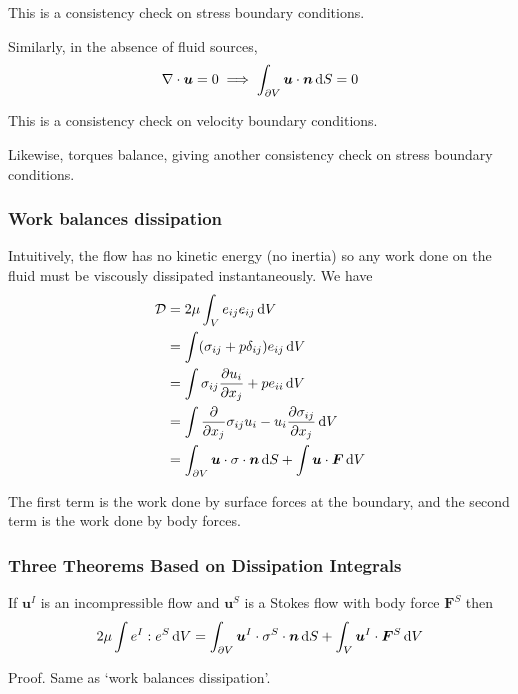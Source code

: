 \documentclass{jknotes}
\begin{document}
This is a consistency check on stress boundary conditions. 

Similarly, in the absence of fluid sources,
\begin{equation}
	\nabla \cdot \bm{u} = 0 \implies \int_{\partial V} \bm{u} \cdot \bm{n} \,
	\diffd S = 0
\end{equation}

This is a consistency check on velocity boundary conditions.

Likewise, torques balance, giving another consistency check on stress boundary
conditions.

\subsubsection{Work balances dissipation}
Intuitively, the flow has no kinetic energy (no inertia)  so any work done on
the fluid must be viscously dissipated instantaneously. We have
\begin{equation}
	\begin{aligned}
		\mathcal{D} &= 2\mu \int_V e_{ij} e_{ij} \, \diffd V \\
				&= \int (\sigma_{ij} + p \delta_{ij}) e_{ij} \, \diffd V \\
	&= \int \sigma_{ij} \frac{\partial u_i}{\partial x_j} + p e_{ii} \, \diffd V \\
	&= \int \frac{\partial}{\partial x_j} \sigma_{ij} u_i - u_i \frac{\partial
	\sigma_{ij}}{\partial x_j} \, \diffd V \\
	&= \int_{\partial V} \bm{u} \cdot \sigma \cdot \bm{n} \, \diffd S + \int
	\bm{u} \cdot \bm{F} \, \diffd V
	\end{aligned}
\end{equation}

The first term is the work done by surface forces at the boundary, and the
second term is the work done by body forces.

\subsubsection{Three Theorems Based on Dissipation Integrals}
\begin{lemma}
	\label{l1}
	If $\bm{u}^I$ is an incompressible flow and $\bm{u}^S$ is a Stokes flow
	with body force $\bm{F}^S$ then 
	\begin{equation}
		2\mu \int e^{I} : e^{S} \, \diffd V = \int_{\partial V} \bm{u}^I \cdot
		\sigma^S \cdot \bm{n} \, \diffd S + \int_V \bm{u}^I \cdot \bm{F}^S \,
		\diffd V
	\end{equation}
\end{lemma}
Proof. Same as `work balances dissipation'.
\end{document}
